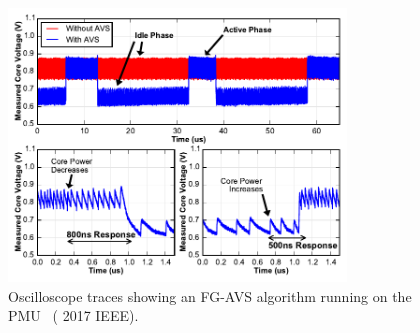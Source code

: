 \documentclass[graybox]{svmult}
\begin{document}
\begin{figure}
  \centering
  \includegraphics[width=0.8\textwidth]{6-raven4-avs}
  \caption{Oscilloscope traces showing an FG-AVS algorithm running on the PMU~\cite{Keller2017} ({\textcopyright} 2017 IEEE).}
  \label{fig:6-raven4-avs}
\end{figure}
\end{document}
